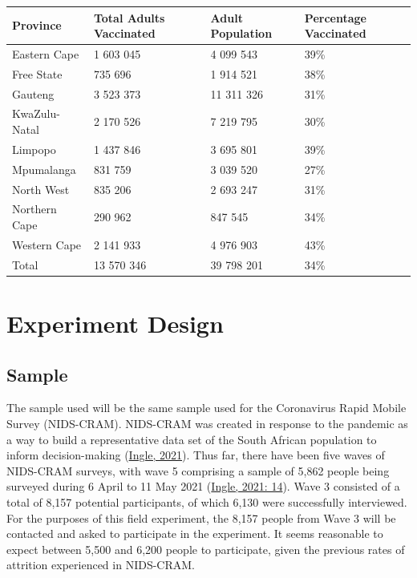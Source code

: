 \documentclass[11pt,preprint, authoryear]{elsarticle}
\let\origtable\table
\let\endorigtable\endtable
\renewenvironment{table}[1][2] {
    \expandafter\origtable\expandafter[H]
} {
    \endorigtable
}
\numberwithin{equation}{section}
\numberwithin{figure}{section}
\numberwithin{table}{section}
\begin{document}
\begin{table}[H]
\centering
\begin{tabular}{llll}
  \toprule
Province & Total Adults Vaccinated & Adult Population & Percentage Vaccinated \\ 
  \midrule
Eastern Cape & 1 603 045 & 4 099 543 & 39\% \\ 
  Free State & 735 696 & 1 914 521 & 38\% \\ 
  Gauteng & 3 523 373 & 11 311 326 & 31\% \\ 
  KwaZulu-Natal & 2 170 526 & 7 219 795 & 30\% \\ 
  Limpopo & 1 437 846 & 3 695 801 & 39\% \\ 
  Mpumalanga & 831 759 & 3 039 520 & 27\% \\ 
  North West & 835 206 & 2 693 247 & 31\% \\ 
  Northern Cape & 290 962 & 847 545 & 34\% \\ 
  Western Cape & 2 141 933 & 4 976 903 & 43\% \\ 
  Total & 13 570 346 & 39 798 201 & 34\% \\ 
   \bottomrule
\end{tabular}
\caption{Vaccination Statistics \label{tab1}} 
\end{table}

\hypertarget{experiment-design}{%
\section{\texorpdfstring{Experiment Design
\label{design}}{Experiment Design }}\label{experiment-design}}

\hypertarget{sample}{%
\subsection{Sample}\label{sample}}

The sample used will be the same sample used for the Coronavirus Rapid
Mobile Survey (NIDS-CRAM). NIDS-CRAM was created in response to the
pandemic as a way to build a representative data set of the South
African population to inform decision-making
(\protect\hyperlink{ref-nids}{Ingle, 2021}). Thus far, there have been
five waves of NIDS-CRAM surveys, with wave 5 comprising a sample of
5,862 people being surveyed during 6 April to 11 May 2021
(\protect\hyperlink{ref-nids}{Ingle, 2021: 14}). Wave 3 consisted of a
total of 8,157 potential participants, of which 6,130 were successfully
interviewed. For the purposes of this field experiment, the 8,157 people
from Wave 3 will be contacted and asked to participate in the
experiment. It seems reasonable to expect between 5,500 and 6,200 people
to participate, given the previous rates of attrition experienced in
NIDS-CRAM.
\end{document}
